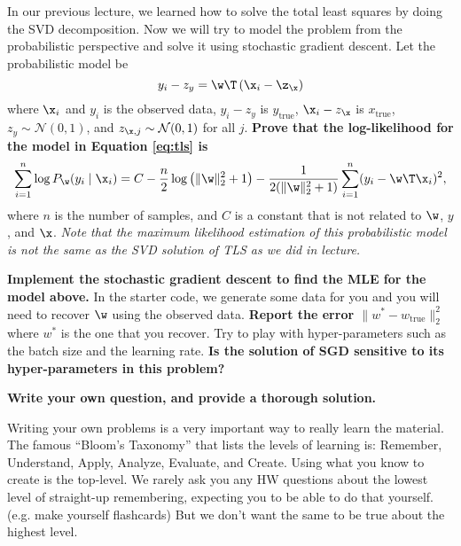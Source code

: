 \documentclass[preview]{standalone}
\begin{document}
\begin{Parts}
\Part In our previous lecture, we learned how to solve the total least squares
by doing the SVD decomposition.  Now we will try to model the problem from the
probabilistic perspective and solve it using stochastic gradient descent.  Let
the probabilistic model be
\begin{equation}
    y_i - z_y = \w\T \left( \x_i - \z_{\x} \right)  \label{eq:tls}
\end{equation}
where $\x_i$ and $y_i$ is the observed data, $y_i-z_y$ is $y_{\mathrm{true}}$,
$\x_i-z_{\x}$ is $x_{\mathrm{true}}$, $z_y \sim \mathcal{N}(0, 1)$, and
$z_{\x,j} \sim \mathcal{N}(0, 1)$ for all $j$.  \textbf{Prove that the
log-likelihood for the model in Equation \eqref{eq:tls} is}
\begin{equation}
    \sum_{i=1}^n \log P_{\w}(y_i \mid \x_i) =
    C-
    \frac n 2\log\left(\lVert \w \rVert_2^2+1\right) -
    \frac{1}{2{\left(\lVert \w \rVert_2^2+1\right)}} \sum_{i=1}^n (y_i-\w\T\x_i)^2,
\end{equation}
where $n$ is the number of samples, and $C$ is a constant that is not related
to $\w$, $y$, and $\x$.  \emph{Note that the maximum likelihood estimation of
this probabilistic model is not the same as the SVD solution of TLS as we did
in lecture.}



\Part \textbf{Implement the stochastic gradient descent to find the MLE for the
model above.}  In the starter code, we generate some data for you and you will
need to recover $\w$ using the observed data. \textbf{Report the error $\lVert
w^*-w_{\mathrm{true}}\rVert_2^2$} where $w^*$ is the one that you recover.  Try
to play with hyper-parameters such as the batch size and the learning rate.
\textbf{Is the solution of SGD sensitive to its hyper-parameters in this
problem?}



\end{Parts}


{\bf Write your own question, and provide a thorough solution.}

Writing your own problems is a very important way to really learn
the material. The famous ``Bloom's Taxonomy'' that lists the levels of
learning is: Remember, Understand, Apply, Analyze, Evaluate, and
Create. Using what you know to create is the top-level. We rarely ask
you any HW questions about the lowest level of straight-up
remembering, expecting you to be able to do that yourself. (e.g. make
yourself flashcards) But we don't want the same to be true about the
highest level.
\end{document}
